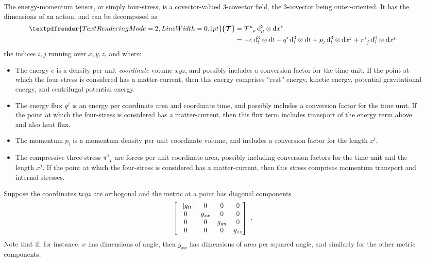 \documentclass[\ifafour a4paper,12pt,\else a5paper,10pt,\fi%
onecolumn,oneside,article,%
british%
]{memoir}
\theoremstyle{remark}
\theoremstyle{innote}
\renewcommand*{\bm}[1]{\textpdfrender{TextRenderingMode=2,LineWidth=0.1pt}{\boldsymbol{#1}}}
\newcommand*{\di}{\mathrm{d}}%
\DeclarePairedDelimiter\abs{\lvert}{\rvert}
\renewcommand*{\|}[1][]{\nonscript\:#1\vert\nonscript\:\mathopen{}}
\renewcommand*{\i}{{}\indices}
\newcommand*{\si}[1]{\di{#1}}
\newcommand*{\ttti}[1]{\di^{3}_{#1}}
\newcommand*{\yTT}{\bm{\mathcal{T}}}
\newcommand*{\yT}{\mathcal{T}}
\newcommand*{\ye}{e}
\begin{document}
The energy-momentum tensor, or simply four-stress, is a covector-valued 3-covector field, the 3-covector being outer-oriented. It has the dimensions of an action, and can be decomposed as
\begin{equation}
  \label{eq:decomp_T}
  \begin{split}
    \yTT &= \yT\i{^{\mu}_{\nu}}\,\ttti{\mu}\otimes\si{x^{\nu}}
    \\&=
    -\ye\, \ttti{t}\otimes\si{t} 
    -q^{i}\, \ttti{i}\otimes\si{t} 
    +p_{j}\, \ttti{t}\otimes\si{x^{j}} 
    +\pi\i{^{i}_{j}}\, \ttti{i}\otimes\si{x^{j}}
  \end{split}
\end{equation}
the indices $i,j$ running over $x,y,z$, and where:
\begin{itemize}
\item The energy $\ye$ is a density per unit \emph{coordinate} volume $xyz$, and possibly includes a conversion factor for the time unit. If the point at which the four-stress is considered has a matter-current, then this energy comprises \enquote{rest} energy, kinetic energy, potential gravitational energy, and centrifugal potential energy.
\item The energy flux $q^{j}$ is an energy per coordinate area and coordinate time, and possibly includes a conversion factor for the time unit. If the point at which the four-stress is considered has a matter-current, then this flux term includes transport of the energy term above and also heat flux.
\item The momentum $p_{i}$ is a momentum density per unit coordinate volume, and includes a conversion factor for the length $x^{i}$.
\item The compressive three-stress $\pi\i{^{i}_{j}}$ are forces per unit coordinate area, possibly including conversion factors for the time unit and the length $x^{j}$.  If the point at which the four-stress is considered has a matter-current, then this stress comprises momentum transport and internal stresses.
\end{itemize}

Suppose the coordinates $txyz$ are orthogonal and the metric at a point has diagonal components
\begin{equation}
  \label{eq:metric_orthonormal}
  \begin{bmatrix}
    -\abs{g_{tt}}&0&0&0\\0&g_{xx}&0&0\\0&0&g_{yy}&0\\0&0&0&g_{zz}
  \end{bmatrix} \ .
\end{equation}
Note that if, for instance, $x$ has dimensions of angle, then $g_{xx}$ has dimensions of area per squared angle, and similarly for the other metric components.
\end{document}
